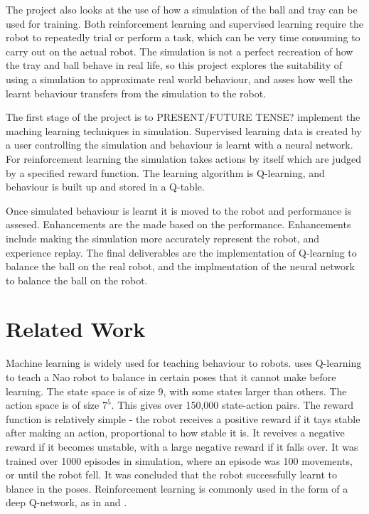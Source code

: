 \documentclass[12pt,a4paper]{article}
\begin{document}
The project also looks at the use of how a simulation of the ball and tray can be used for training. Both reinforcement learning and supervised learning require the robot to repeatedly trial or perform a task, which can be very time consuming to carry out on the actual robot. The simulation is not a perfect recreation of how the tray and ball behave in real life, so this project explores the suitability of using a simulation to approximate real world behaviour, and asses how well the learnt behaviour transfers from the simulation to the robot. 

The first stage of the project is to PRESENT/FUTURE TENSE? implement the maching learning techniques in simulation. Supervised learning data is created by a user controlling the simulation and behaviour is learnt with a neural network. For reinforcement learning the simulation takes actions by itself which are judged by a specified reward function. The learning algorithm is Q-learning, and behaviour is built up and stored in a Q-table. 

Once simulated behaviour is learnt it is moved to the robot and performance is assesed. Enhancements are the made based on the performance. Enhancements include making the simulation more accurately represent the robot, and experience replay. The final deliverables are the implementation of Q-learning to balance the ball on the real robot, and the implmentation of the neural network to balance the ball on the robot.


\section{Related Work}
Machine learning is widely used for teaching behaviour to robots. \cite{nao_balance} uses Q-learning to teach a Nao robot to balance in certain poses that it cannot make before learning. The state space is of size 9, with some states larger than others. The action space is of size $7^5$. This gives over 150,000 state-action pairs. The reward function is relatively simple - the robot receives a positive reward if it tays stable after making an action, proportional to how stable it is. It reveives a negative reward if it becomes unstable, with a large negative reward if it falls over. It was trained over 1000 episodes in simulation, where an episode was 100 movements, or until the robot fell. It was concluded that the robot successfully learnt to blance in the poses. Reinforcement learning is commonly used in the form of a deep Q-network, as in \cite{sim_robot_arm} and \cite{robot_wheel}. 
\end{document}
